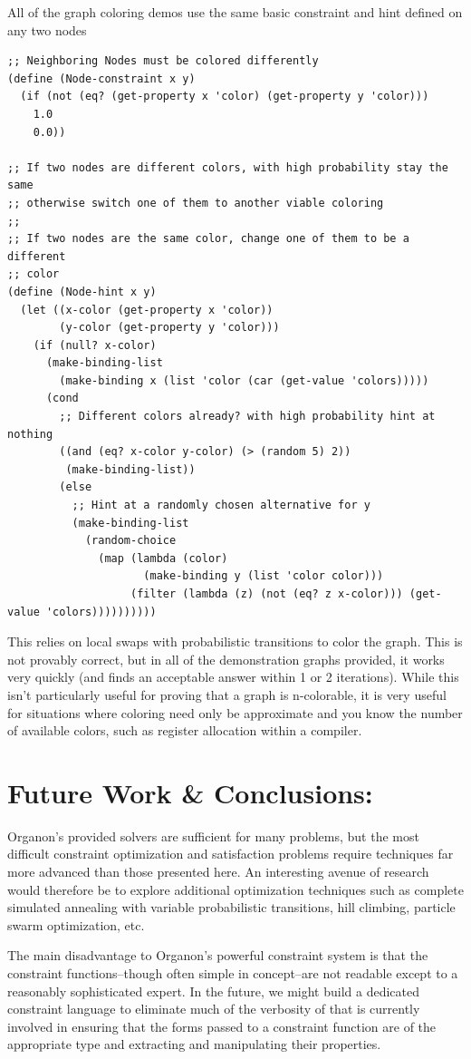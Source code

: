 \documentclass[12pt,a4paper]{article}
\begin{document}
All of the graph coloring demos use the same basic constraint and hint defined on any two nodes
\begin{lstlisting}
;; Neighboring Nodes must be colored differently
(define (Node-constraint x y)
  (if (not (eq? (get-property x 'color) (get-property y 'color)))
    1.0
    0.0))

;; If two nodes are different colors, with high probability stay the same
;; otherwise switch one of them to another viable coloring
;;
;; If two nodes are the same color, change one of them to be a different
;; color
(define (Node-hint x y)
  (let ((x-color (get-property x 'color))
        (y-color (get-property y 'color)))
    (if (null? x-color)
      (make-binding-list
        (make-binding x (list 'color (car (get-value 'colors)))))
      (cond
        ;; Different colors already? with high probability hint at nothing
        ((and (eq? x-color y-color) (> (random 5) 2))
         (make-binding-list))
        (else
          ;; Hint at a randomly chosen alternative for y
          (make-binding-list
            (random-choice
              (map (lambda (color)
                     (make-binding y (list 'color color)))
                   (filter (lambda (z) (not (eq? z x-color))) (get-value 'colors))))))))))
\end{lstlisting}

This relies on local swaps with probabilistic transitions to color the graph.  This is not provably correct, but in all of the demonstration graphs provided, it works very quickly (and finds an acceptable answer within 1 or 2 iterations). While this isn't particularly useful for proving that a graph is n-colorable, it is very useful for situations where coloring need only be approximate and you know the number of available colors, such as register allocation within a compiler.

\section{Future Work \& Conclusions:}
Organon's provided solvers are sufficient for many problems, but the most difficult constraint optimization and satisfaction problems require techniques far more advanced than those presented here.  An interesting avenue of research would therefore be to explore additional optimization techniques such as complete simulated annealing with variable probabilistic transitions, hill climbing, particle swarm optimization, etc.

The main disadvantage to Organon's powerful constraint system is that the constraint functions--though often simple in concept--are not readable except to a reasonably sophisticated expert. In the future, we might build a dedicated constraint language to eliminate much of the verbosity of that is currently involved in ensuring that the forms passed to a constraint function are of the appropriate type and extracting and manipulating their properties.
\end{document}
